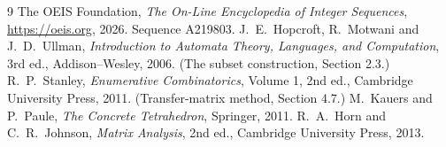 \documentclass[11pt,a4paper]{article}
\theoremstyle{plain}
\theoremstyle{definition}
\begin{document}
\begin{thebibliography}{9}
 The OEIS Foundation, \emph{The On-Line Encyclopedia of Integer
Sequences}, \url{https://oeis.org}, 2026. Sequence A219803.
 J.~E.~Hopcroft, R.~Motwani and J.~D.~Ullman, \emph{Introduction to Automata
Theory, Languages, and Computation}, 3rd ed., Addison--Wesley, 2006. (The subset
construction, Section 2.3.)
 R.~P.~Stanley, \emph{Enumerative Combinatorics}, Volume 1, 2nd ed.,
Cambridge University Press, 2011. (Transfer-matrix method, Section 4.7.)
 M.~Kauers and P.~Paule, \emph{The Concrete Tetrahedron}, Springer, 2011.
 R.~A.~Horn and C.~R.~Johnson, \emph{Matrix Analysis}, 2nd ed., Cambridge
University Press, 2013.
\end{thebibliography}
\end{document}
